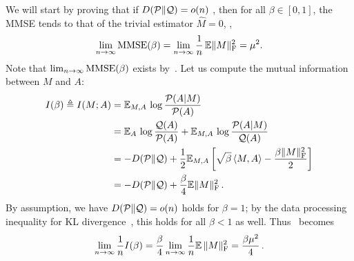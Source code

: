We will start by proving that if $D (\mathcal{P} \| \mathcal{Q}) =o(n)$ , then
for all $\beta \in [0, 1]$, the MMSE tends to that of the trivial estimator $\hat{M} = 0$,  \ie,
\begin{align}
	\lim_{n \to \infty} {\rm MMSE} (\beta) =   \lim_{n\to \infty}  \frac{ 1}{n} \,\mathbb{E} \|M\|_{\rm F}^2  = \mu^2 . \label{eq:mmse_formula}
\end{align}
Note that $\lim_{n\to \infty} {\rm MMSE}(\beta)$ exists by~\cite[Proposition III.2]{MontanariPCA14}. 
Let us compute the mutual information between $M$ and $A$: 
\begin{align}
	I(\beta) \triangleq I(M;A)
	& = \mathbb{E}_{M, A} \, \log \frac{\mathcal{P}(A|M)}{\mathcal{P}(A)} \label{eq:Ibeta}\\
	& =  \mathbb{E}_{A} \, \log \frac{\mathcal{Q}(A)}{\mathcal{P}(A)} +  \mathbb{E}_{M, A} \, \log  \frac{ \mathcal{P}(A|M)}{ \mathcal{Q}(A) } 	\nonumber \\
	& = - D (\mathcal{P} \| \mathcal{Q}) +  \frac{1}{2} \mathbb{E}_{M, A} \left[ \sqrt{\beta } \left \langle M, A \right\rangle - \frac{ \beta \|M\|_{\rm F}^2}{2} \right] 
	\nonumber \\
	& = - D (\mathcal{P} \| \mathcal{Q}) + \frac{\beta }{4}  \mathbb{E} \|M \|_{\rm F}^2 \, .
	\label{eq:MI_formula0}
\end{align}
By assumption,  we have $D(\mathcal{P} \| \mathcal{Q}) = o(n)$ holds for $\beta=1$; 
by the data processing inequality for KL divergence~\cite{Csiszar67}, this holds for all $\beta < 1$ as well.  
Thus~ becomes
\begin{align}
	\lim_{n \to \infty} \frac{1}{n} I(\beta ) = \frac{\beta }{4} \lim_{n\to \infty}  \frac{ 1}{n} \mathbb{E}\, \|M\|_{\rm F}^2 = \frac{\beta \mu^2}{4} \, .
	\label{eq:MI_formula}
\end{align}

